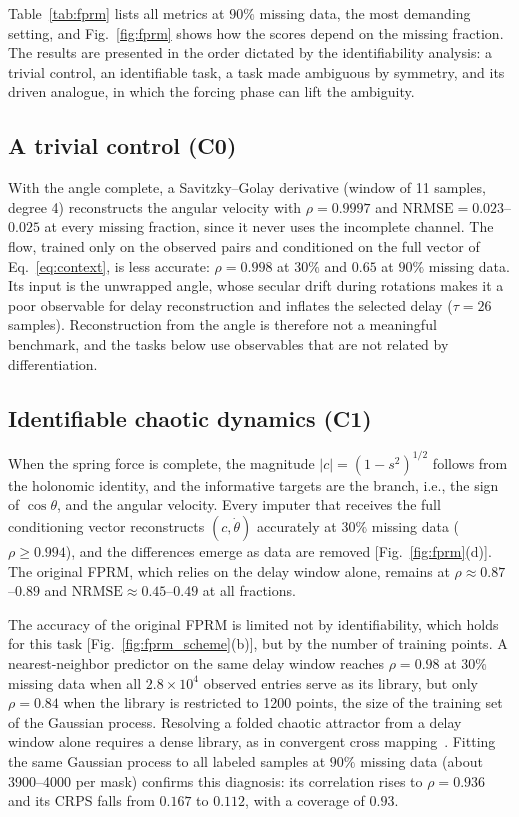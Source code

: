 Table~\ref{tab:fprm} lists all metrics at $90\%$ missing data, the most demanding setting, and Fig.~\ref{fig:fprm} shows how the scores depend on the missing fraction. The results are presented in the order dictated by the identifiability analysis: a trivial control, an identifiable task, a task made ambiguous by symmetry, and its driven analogue, in which the forcing phase can lift the ambiguity.

\subsection{A trivial control (C0)}\label{sec:res_c0}

With the angle complete, a Savitzky--Golay derivative (window of 11 samples, degree 4) reconstructs the angular velocity with $\rho=0.9997$ and $\mathrm{NRMSE}=0.023$--$0.025$ at every missing fraction, since it never uses the incomplete channel. The flow, trained only on the observed pairs and conditioned on the full vector of Eq.~\eqref{eq:context}, is less accurate: $\rho=0.998$ at $30\%$ and $0.65$ at $90\%$ missing data. Its input is the unwrapped angle, whose secular drift during rotations makes it a poor observable for delay reconstruction and inflates the selected delay ($\tau=26$ samples). Reconstruction from the angle is therefore not a meaningful benchmark, and the tasks below use observables that are not related by differentiation.

\subsection{Identifiable chaotic dynamics (C1)}\label{sec:res_c1}

When the spring force is complete, the magnitude $|c|=(1-s^{2})^{1/2}$ follows from the holonomic identity, and the informative targets are the branch, i.e., the sign of $\cos\theta$, and the angular velocity. Every imputer that receives the full conditioning vector reconstructs $(c,\dot\theta)$ accurately at $30\%$ missing data ($\rho\ge0.994$), and the differences emerge as data are removed [Fig.~\ref{fig:fprm}(d)]. The original FPRM, which relies on the delay window alone, remains at $\rho\approx0.87$--$0.89$ and $\mathrm{NRMSE}\approx0.45$--$0.49$ at all fractions.

The accuracy of the original FPRM is limited not by identifiability, which holds for this task [Fig.~\ref{fig:fprm_scheme}(b)], but by the number of training points. A nearest-neighbor predictor on the same delay window reaches $\rho=0.98$ at $30\%$ missing data when all $2.8\times10^{4}$ observed entries serve as its library, but only $\rho=0.84$ when the library is restricted to 1200 points, the size of the training set of the Gaussian process. Resolving a folded chaotic attractor from a delay window alone requires a dense library, as in convergent cross mapping~\cite{Sugihara2012}. Fitting the same Gaussian process to all labeled samples at $90\%$ missing data (about 3900--4000 per mask) confirms this diagnosis: its correlation rises to $\rho=0.936$ and its CRPS falls from $0.167$ to $0.112$, with a coverage of $0.93$.

